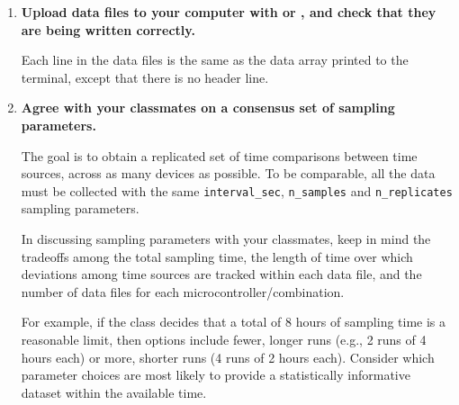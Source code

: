 \begin{enumerate}
	\smallskip
	If the \ntp	\, server cannot be accessed, the last four entries are replaced by ``-1'', to make them easy to distinguish from real data:	
\begin{lstlisting}[language=Python]
sample_num,day_onboard,hour_onboard,min_onboard,sec_onboard,day_external,hour_external,min_external,sec_external,day_NTP,hour_NTP,min_NTP,sec_NTP
0 8 22 19 14 8 22 19 14 -1 -1 -1 -1 
1 8 22 19 41 8 22 19 41 -1 -1 -1 -1 
2 8 22 20 8 8 22 20 8 -1 -1 -1 -1 
\end{lstlisting}
	
	
	As you watch the output, it is easy to pick out differences in seconds, minutes etc. among the time stamps (if there are any).
	
	\item \textbf{Upload data files to your computer with \mpfshell or \webrepl, and check that they are being written correctly.}
	
	Each line in the data files is the same as the data array printed to the terminal, except that there is no header line.
	
	\item \textbf{Agree with your classmates on a consensus set of sampling parameters.}
	
	The goal is to obtain a replicated set of time comparisons between time sources, across as many devices as possible. 
	To be comparable, all the data must be collected with the same \lstinline{interval_sec}, \lstinline{n_samples} and \lstinline{n_replicates} sampling parameters.
	
	\smallskip
	In discussing sampling parameters with your classmates, keep in mind the tradeoffs among the total sampling time, the length of time over which deviations among time sources are tracked within each data file, and the number of data files for each microcontroller/\rtc combination. 
	
	\smallskip
	For example, if the class decides that a total of 8 hours of sampling time is a reasonable limit, then options include fewer, longer runs (e.g., 2 runs of 4 hours each) or more, shorter runs (4 runs of 2 hours each).
	Consider which parameter choices are most likely to provide a statistically informative dataset within the available time.
	

\end{enumerate}
